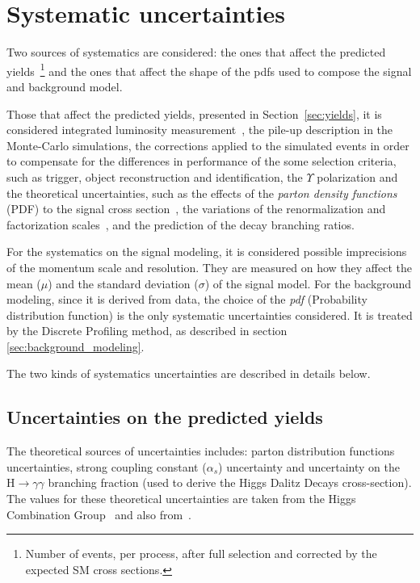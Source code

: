 \section{Systematic uncertainties}

Two sources of systematics are considered: the ones that affect the predicted yields~\footnote{Number of events, per process, after full selection and corrected by the expected SM cross sections.} and the ones that affect the shape of the pdfs used to compose the signal and background model.

Those that affect the predicted yields, presented in Section~\ref{sec:yields}, it is considered integrated luminosity measurement~\cite{CMS-PAS-LUM-17-001}, the pile-up description in the Monte-Carlo simulations, the corrections applied to the simulated events in order to compensate for the differences in performance of the some selection criteria, such as trigger, object reconstruction and identification, the $\Upsilon$ polarization and the theoretical uncertainties, such as the effects of the \textit{parton density functions} (PDF) to the signal cross section~\cite{NNPDF3,deFlorian:2016spz,Butterworth:2015oua}, the variations of the renormalization and factorization scales~\cite{Martin:2009iq,Lai:2010vv,Alekhin:2011sk,Botje:2011sn,Ball:2011mu}, and the prediction of the decay branching ratios. 

For the systematics on the signal modeling, it is considered possible imprecisions of the momentum scale and resolution. They are measured on how they affect the mean ($\mu$) and the standard deviation ($\sigma$) of the signal model. For the background modeling, since it is derived from data, the choice of the \textit{pdf} (Probability distribution function) is the only systematic uncertainties considered. It is treated by the Discrete Profiling method, as described in section \ref{sec:background_modeling}. 

The two kinds of systematics uncertainties are described in details below.

\subsection{Uncertainties on the predicted yields}

The theoretical sources of uncertainties includes: parton distribution functions uncertainties, strong coupling constant ($\alpha_{s}$) uncertainty and uncertainty on the $\mathrm{H} \to \gamma\gamma$ branching fraction (used to derive the Higgs Dalitz Decays cross-section). The values for these theoretical uncertainties are taken from the Higgs Combination Group~\cite{CERNYellowReportPageAt13TeV} and also from~\cite{Passarino:2013nka,Botje:2011sn}.

